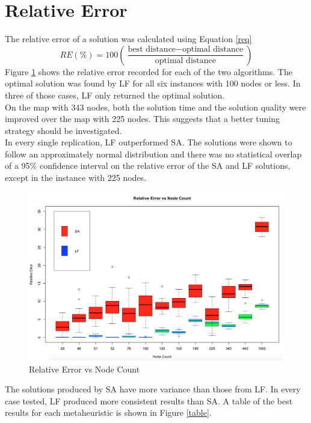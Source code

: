 \documentclass[12pt,letterpaper,oneside]{book}
\begin{document}
\section{Relative Error}
The relative error of a solution was calculated using Equation \ref{req}
\begin{equation}
	RE (\%)=100\left(\dfrac{\text{best distance}-\text{optimal distance}}{\text{optimal distance}}\right)
	\label{req}
\end{equation}
Figure \ref{re} shows the relative error recorded for each of the two algorithms. The optimal solution was found by LF for all six instances with 100 nodes or less. In three of those cases, LF only returned the optimal solution.\\
On the map with 343 nodes, both the solution time and the solution quality were improved over the map with 225 nodes. This suggests that a better tuning strategy should be investigated.\\
In every single replication, LF outperformed SA. The solutions were shown to follow an approximately normal distribution and there was no statistical overlap of a 95\% confidence interval on the relative error of the SA and LF solutions, except in the instance with 225 nodes.
\begin{figure}[H]
	\centering
	\includegraphics[width=1\linewidth]{re.png}
	\caption{Relative Error vs Node Count}
	\label{re}
\end{figure}
The solutions produced by SA have more variance than those from LF. In every case tested, LF produced more consistent results than SA. A table of the best results for each metaheuristic is shown in Figure \ref{table}.
\end{document}
